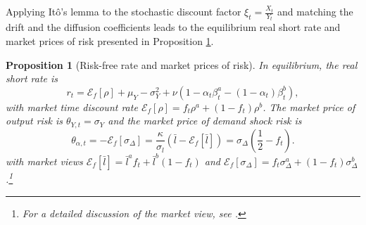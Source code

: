 \documentclass[preprint,11pt,authoryear]{elsarticle}
\theoremstyle{plain}
\newtheorem{prop}{Proposition}
\begin{document}
%
Applying It\^o's lemma to the stochastic discount factor $\xi_t = \frac{X_t}{Y_t}$ and matching the drift and the diffusion coefficients leads to the equilibrium real short rate and market prices of risk presented in Proposition \ref{prop_rtandtheta}. 
 \begin{prop}[Risk-free rate and market prices of risk]\label{prop_rtandtheta}
In equilibrium, the real short rate is 
\begin{equation}\label{rt}
    r_t =  \mathcal{E}_{f}\left [ \rho \right]  + \mu_Y - \sigma_Y^2 + \nu\left(1 - \alpha_t \beta^a_t - \left(1-\alpha_t\right)\beta^b_t\right),
\end{equation}
with market time discount rate $\mathcal{E}_{f}\left [ \rho \right] = f_t \rho^a + \left(1-f_t\right)\rho^b$. The market price of output risk is $\theta_{Y,t} = \sigma_Y$ and the market price of demand shock risk is
\begin{equation}\label{theta_alphat}
	\theta_{\alpha,t}  = -\mathcal{E}_{f}\left [ \sigma_{\Delta}  \right]  = \frac{\kappa}{\sigma_l} ( 
	\bar{l} - \mathcal{E}_{f}\left[\bar{l} \right] ) 
	=  \sigma_{\Delta}\left(\frac{1}{2} - f_t \right).
\end{equation}
with market views $\mathcal{E}_{f}\left[\bar{l} \right]= \bar{l}^a f_t + \bar{l}^b  ( 1- f_t  )$ and $\mathcal{E}_{f} \left [ \sigma_{\Delta} \right] = f_t \sigma_{\Delta}^a  + \left(1-f_t\right)\sigma_{\Delta}^b$.\footnote{For a detailed discussion of the market view, see \cite{HLI2025}.}
\end{prop}
\end{document}
